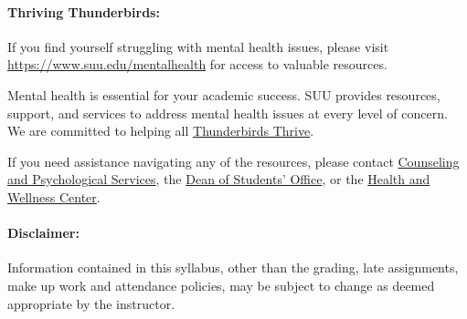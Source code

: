 \documentclass[12pt, letterpaper]{article}
\begin{document}
\paragraph{Thriving Thunderbirds:}
If you find yourself struggling with mental health issues, please visit \href{https://www.suu.edu/mentalhealth}{https://www.suu.edu/mentalhealth} for access to valuable resources. 

\noindent
Mental health is essential for your academic success. SUU provides resources, support, and services to address mental health issues at every level of concern. We are committed to helping all \href{https://www.suu.edu/mentalhealth/}{Thunderbirds Thrive}. 

\noindent
If you need assistance navigating any of the resources, please contact \href{https://www.suu.edu/caps/}{Counseling and Psychological Services}, the \href{https://www.suu.edu/deanofstudents/}{Dean of Students’ Office}, or the \href{https://www.suu.edu/health/}{Health and Wellness Center}.


\paragraph{Disclaimer:}
Information contained in this syllabus, other than the grading, late assignments, make up work and attendance policies, may be subject to change as deemed appropriate by the instructor.
\end{document}
